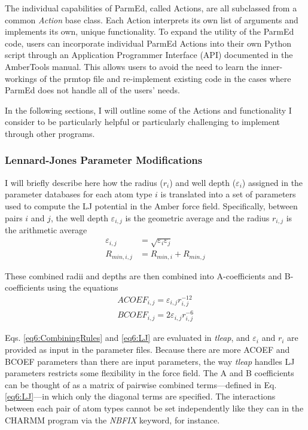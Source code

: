The individual capabilities of ParmEd, called Actions, are all subclassed from a
common \emph{Action} base class. Each Action interprets its own list of
arguments and implements its own, unique functionality. To expand the utility of
the ParmEd code, users can incorporate individual ParmEd Actions into their own
Python script through an Application Programmer Interface (API) documented in
the AmberTools manual. This allows users to avoid the need to learn the
inner-workings of the prmtop file and re-implement existing code in the cases
where ParmEd does not handle all of the users' needs.

In the following sections, I will outline some of the Actions and functionality
I consider to be particularly helpful or particularly challenging to implement
through other programs.

\subsubsection{Lennard-Jones Parameter Modifications}

I will briefly describe here how the radius ($r_i$) and well depth
($\varepsilon_i$) assigned in the parameter databases for each atom type $i$ is
translated into a set of parameters used to compute the LJ potential in the
Amber force field. Specifically, between pairs $i$ and $j$, the well depth
$\varepsilon_{i,j}$ is the geometric average and the radius $r_{i,j}$ is the
arithmetic average
\begin{align}
   \varepsilon_{i,j} & = \sqrt{\varepsilon_i \varepsilon_j} \nonumber \\
   R_{min,i,j} & = R_{min,i} + R_{min,j}
   \label{eq6:CombiningRules}
\end{align}

These combined radii and depths are then combined into A-coefficients and
B-coefficients using the equations
\begin{align}
   ACOEF_{i,j} = \varepsilon_{i,j}r_{i,j}^{-12} \nonumber \\
   BCOEF_{i,j} = 2 \varepsilon_{i,j}r_{i,j}^{-6}
   \label{eq6:LJ}
\end{align}

Eqs. \ref{eq6:CombiningRules} and \ref{eq6:LJ} are evaluated in \emph{tleap},
and $\varepsilon_i$ and $r_i$ are provided as input in the parameter files.
Because there are more ACOEF and BCOEF parameters than there are input
parameters, the way \emph{tleap} handles LJ parameters restricts some
flexibility in the force field. The A and B coefficients can be thought of as a
matrix of pairwise combined terms---defined in Eq. \ref{eq6:LJ}---in which only
the diagonal terms are specified. The interactions between each pair of atom
types cannot be set independently like they can in the CHARMM program via the
\emph{NBFIX} keyword, for instance.

